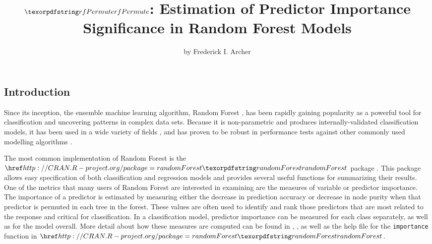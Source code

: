 \title{\(\pkg{rfPermute}\): Estimation of Predictor Importance Significance in
Random Forest Models}
\author{by Frederick I. Archer}

\maketitle


\subsection{Introduction}\label{introduction}

Since its inception, the ensemble machine learning algorithm, Random
Forest \citep{RN266}, has been rapidly gaining popularity as a powerful
tool for classification and uncovering patterns in complex data sets.
Because it is non-parametric and produces internally-validated
classification models, it has been used in a wide variety of fields
\citep{RN126, RN128, RN268}, and has proven to be robust in performance
tests against other commonly used modelling algorithms \citep{RN125}.

The most common implementation of Random Forest is the
\(\CRANpkg{randomForest}\) package \citep{RN127}. This package allows
easy specification of both classification and regression models and
provides several useful functions for summarizing their results. One of
the metrics that many users of Random Forest are interested in examining
are the measures of variable or predictor importance. The importance of
a predictor is estimated by measuring either the decrease in prediction
accuracy or decrease in node purity when that predictor is permuted in
each tree in the forest. These values are often used to identify and
rank those predictors that are most related to the response and critical
for classification. In a classification model, predictor importance can
be measured for each class separately, as well as for the model overall.
More detail about how these measures are computed can be found in
\citet{RN403}, \citet{RN127}, as well as the help file for the
\texttt{importance} function in \(\CRANpkg{randomForest}\).

